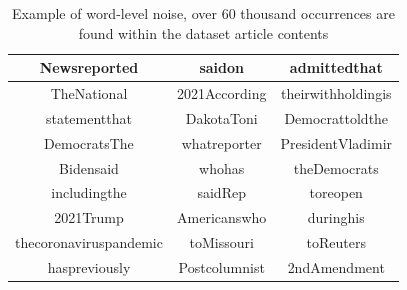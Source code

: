 \begin{table}[htbp]
    \centering
    \small
    \begin{tabular}{| c | c | c |}
        \hline
        Newsreported           & saidon        & admittedthat       \\
        \hline
        TheNational            & 2021According & theirwithholdingis \\
        \hline
        statementthat          & DakotaToni    & Democrattoldthe    \\
        \hline
        DemocratsThe           & whatreporter  & PresidentVladimir  \\
        \hline
        Bidensaid              & whohas        & theDemocrats       \\
        \hline
        includingthe           & saidRep       & toreopen           \\
        \hline
        2021Trump              & Americanswho  & duringhis          \\
        \hline
        thecoronaviruspandemic & toMissouri    & toReuters          \\
        \hline
        haspreviously          & Postcolumnist & 2ndAmendment       \\
        \hline
    \end{tabular}
    \caption{Example of word-level noise, over 60 thousand occurrences are found within the dataset article contents}
    \label{table:conjoined_words}
\end{table}

